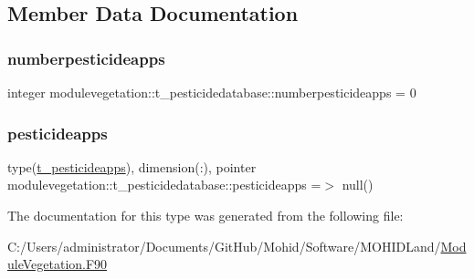\subsection{Member Data Documentation}
\mbox{\label{structmodulevegetation_1_1t__pesticidedatabase_acd5f1c1f199209c6f50cf2b397abec0a}} 
\subsubsection{\texorpdfstring{numberpesticideapps}{numberpesticideapps}}
{\footnotesize\ttfamily integer modulevegetation\+::t\+\_\+pesticidedatabase\+::numberpesticideapps = 0\hspace{0.3cm}{\ttfamily [private]}}

\mbox{\label{structmodulevegetation_1_1t__pesticidedatabase_a846e29f9abf2154be19358f5114d9f99}} 
\subsubsection{\texorpdfstring{pesticideapps}{pesticideapps}}
{\footnotesize\ttfamily type(\mbox{\hyperlink{structmodulevegetation_1_1t__pesticideapps}{t\+\_\+pesticideapps}}), dimension(\+:), pointer modulevegetation\+::t\+\_\+pesticidedatabase\+::pesticideapps =$>$ null()\hspace{0.3cm}{\ttfamily [private]}}



The documentation for this type was generated from the following file\+:\begin{DoxyCompactItemize}
\item 
C\+:/\+Users/administrator/\+Documents/\+Git\+Hub/\+Mohid/\+Software/\+M\+O\+H\+I\+D\+Land/\mbox{\hyperlink{_module_vegetation_8_f90}{Module\+Vegetation.\+F90}}\end{DoxyCompactItemize}
